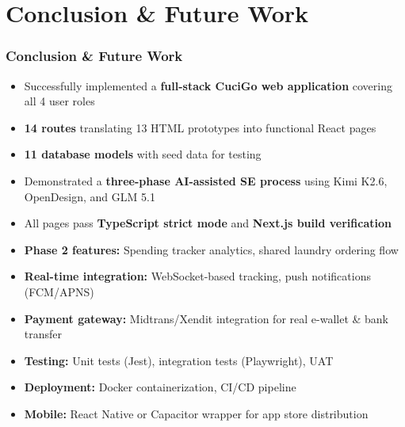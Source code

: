 \documentclass[aspectratio=169,professionalfonts,10pt]{beamer}
\begin{document}
\section{Conclusion \& Future Work}

\begin{frame}
    \frametitle{Conclusion \& Future Work}
    \small
    \begin{tcolorbox}[colback=ugmLightGrey,colframe=ugmBlue,title=\small Summary]
        \scriptsize
        \begin{itemize}\setlength{\itemsep}{1pt}
            \item Successfully implemented a \textbf{full-stack CuciGo web application} covering all 4 user roles
            \item \textbf{14 routes} translating 13 HTML prototypes into functional React pages
            \item \textbf{11 database models} with seed data for testing
            \item Demonstrated a \textbf{three-phase AI-assisted SE process} using Kimi K2.6, OpenDesign, and GLM 5.1
            \item All pages pass \textbf{TypeScript strict mode} and \textbf{Next.js build verification}
        \end{itemize}
    \end{tcolorbox}

    \vspace{0.3em}

    \begin{tcolorbox}[colback=cucigoTeal!10,colframe=cucigoTeal,title=\small Future Work]
        \scriptsize
        \begin{itemize}\setlength{\itemsep}{1pt}
            \item \textbf{Phase 2 features:} Spending tracker analytics, shared laundry ordering flow
            \item \textbf{Real-time integration:} WebSocket-based tracking, push notifications (FCM/APNS)
            \item \textbf{Payment gateway:} Midtrans/Xendit integration for real e-wallet \& bank transfer
            \item \textbf{Testing:} Unit tests (Jest), integration tests (Playwright), UAT
            \item \textbf{Deployment:} Docker containerization, CI/CD pipeline
            \item \textbf{Mobile:} React Native or Capacitor wrapper for app store distribution
        \end{itemize}
    \end{tcolorbox}
\end{frame}
\end{document}
